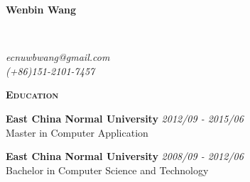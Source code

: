 \documentclass[a4paper]{article}
\newenvironment{changemargin}[2]{%
  \begin{list}{}{%
    \setlength{\topsep}{0pt}%
    \setlength{\leftmargin}{#1}%
    \setlength{\rightmargin}{#2}%
    \setlength{\listparindent}{\parindent}%
    \setlength{\itemindent}{\parindent}%
    \setlength{\parsep}{\parskip}%
  }%
  \item[]}{\end{list}
}
\newcommand{\lineover}{
	\begin{changemargin}{-0.05in}{-0.05in}
		\vspace*{-8pt}
		\hrulefill \\
		\vspace*{-2pt}
	\end{changemargin}
}
\newcommand{\header}[1]{
	\begin{changemargin}{-0.5in}{-0.5in}
		\scshape{\large \textbf{#1}}\\
	\end{changemargin}
}
\newcommand{\contact}[3]{
	\begin{changemargin}{-0.5in}{-0.5in}
		{\Large \textbf{#1}}\\ \smallskip
		\lineover
		\begin{flushright}
			\emph{#2}\\ \smallskip
			\emph{#3}\smallskip
		\end{flushright}
	\end{changemargin}
}
\newenvironment{body} {
	\vspace*{-16pt}
	\begin{changemargin}{-0.5in}{-0.5in}
  }
	{\end{changemargin}
}
\begin{document}
\contact{Wenbin Wang}{ecnuwbwang@gmail.com}{(+86)151-2101-7457}

\header{Education}

\begin{body}
	\vspace{16pt}

	\textbf{East China Normal University} \hfill \emph{2012/09 - 2015/06}\\
	 Master in Computer Application\\

	\smallskip

	\textbf{East China Normal University} \hfill \emph{2008/09 - 2012/06}\\
	Bachelor in Computer Science and Technology\\
\end{body}

\medskip
\end{document}
